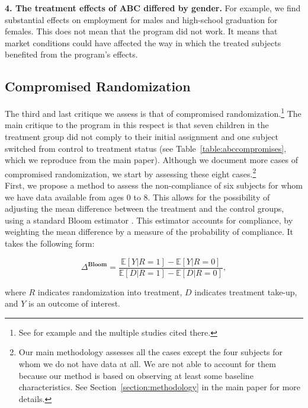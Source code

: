 \begin{appendices}
\noindent  \textbf{4. The treatment effects of ABC differed by gender.} For example, we find substantial effects on employment for males and high-school graduation for females. This does not mean that the program did not work. It means that market conditions could have affected the way in which the treated subjects benefited from the program's effects.\\

\subsection{Compromised Randomization}

\noindent The third and last critique we assess is that of compromised randomization.\footnote{See for example \citet{Baumeister-Bacharach_2000_Early-Generic} and the multiple studies cited there.} The main critique to the program in this respect is that seven children in the treatment group did not comply to their initial assignment and one subject switched from control to treatment status (see Table~\ref{table:abccompromises}, which we reproduce from the main paper). Although we document more cases of compromised randomization, we start by assessing these eight cases.\footnote{Our main methodology assesses all the cases except the four subjects for whom we do not have data at all. We are not able to account for them because our method is based on observing at least some baseline characteristics. See Section~\ref{section:methodology} in the main paper for more details.}\\

\noindent First, we propose a method to assess the non-compliance of six subjects for whom we have data available from ages 0 to 8. This allows for the possibility of adjusting the mean difference between the treatment and the control groups, using a standard Bloom estimator \citep{Bloom_1984_ER}. This estimator accounts for compliance, by weighting the mean difference by a measure of the probability of compliance. It takes the following form: 

\begin{equation}
\Delta^{\textbf{Bloom}} = \frac{\mathbb{E} \left[ Y | R = 1 \right] - \mathbb{E} \left[ Y | R = 0 \right] }{\mathbb{E} \left[ D | R = 1 \right] - \mathbb{E} \left[ D | R = 0 \right]}, 
\end{equation}

\noindent where $R$ indicates randomization into treatment, $D$ indicates treatment take-up, and $Y$ is an outcome of interest.\\


\end{appendices}

